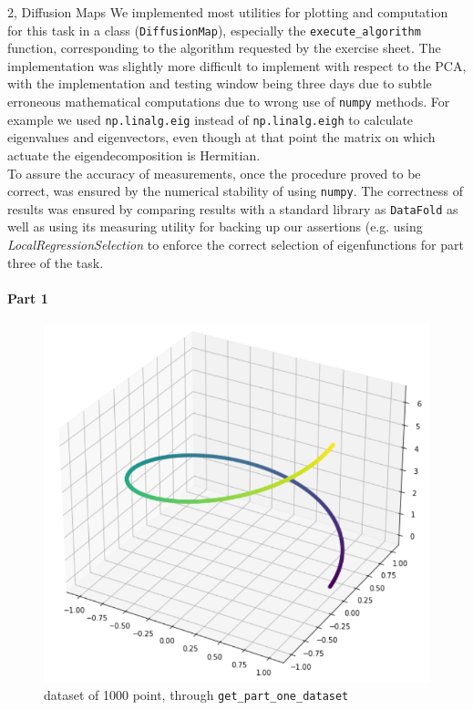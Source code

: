\documentclass[10pt,a4paper]{article}
\begin{document}
\begin{task}{2, Diffusion Maps}
We implemented most utilities for plotting and computation for this task in a class (\texttt{DiffusionMap}), especially the \texttt{execute\_algorithm} function, corresponding to the algorithm requested by the exercise sheet. The implementation was slightly more difficult to implement with respect to the PCA, with the implementation and testing window being three days due to subtle erroneous mathematical computations due to wrong use of \texttt{numpy} methods. For example we used \texttt{np.linalg.eig} instead of \texttt{np.linalg.eigh} to calculate eigenvalues and eigenvectors, even though at that point the matrix on which actuate the eigendecomposition is Hermitian.\\
To assure the accuracy of measurements, once the procedure proved to be correct, was ensured by the numerical stability of using \texttt{numpy}. The correctness of results was ensured by comparing results with a standard library as \texttt{DataFold} as well as using its measuring utility for backing up our assertions (e.g. using \textit{LocalRegressionSelection} to enforce the correct selection of eigenfunctions for part three of the task.
\paragraph{Part 1}

\begin{figure}[H]
    \centering
    \includegraphics[scale=0.4]{images/task2_1_data.png}
    \caption{dataset of 1000 point, through \texttt{get_part_one_dataset}}
    \label{fig:task-2-1-data}
\end{figure}


\end{task}
\end{document}
